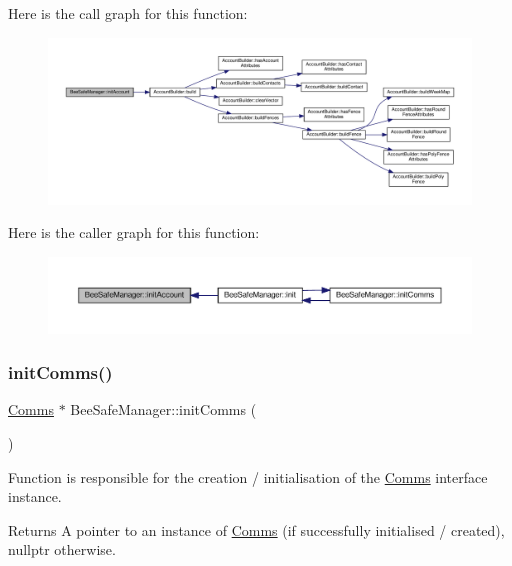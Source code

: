Here is the call graph for this function\+:\nopagebreak
\begin{figure}[H]
\begin{center}
\leavevmode
\includegraphics[width=350pt]{d5/d75/class_bee_safe_manager_a7395aeacd246ce69c65f255a2eab1d04_cgraph}
\end{center}
\end{figure}
Here is the caller graph for this function\+:\nopagebreak
\begin{figure}[H]
\begin{center}
\leavevmode
\includegraphics[width=350pt]{d5/d75/class_bee_safe_manager_a7395aeacd246ce69c65f255a2eab1d04_icgraph}
\end{center}
\end{figure}
\mbox{\label{class_bee_safe_manager_a28306d7ccf7136a6086d666f4ebb6566}} 
\subsubsection{\texorpdfstring{init\+Comms()}{initComms()}}
{\footnotesize\ttfamily \hyperlink{class_comms}{Comms} $\ast$ Bee\+Safe\+Manager\+::init\+Comms (\begin{DoxyParamCaption}{ }\end{DoxyParamCaption})\hspace{0.3cm}{\ttfamily [private]}}

Function is responsible for the creation / initialisation of the \hyperlink{class_comms}{Comms} interface instance.

\begin{DoxyReturn}{Returns}
A pointer to an instance of \hyperlink{class_comms}{Comms} (if successfully initialised / created), nullptr otherwise. 
\end{DoxyReturn}


